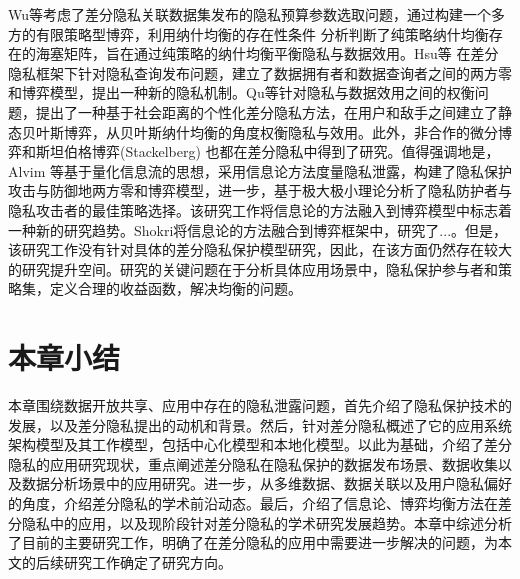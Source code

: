 Wu等\cite{Wu2017Game}考虑了差分隐私关联数据集发布的隐私预算参数选取问题，通过构建一个多方的有限策略型博弈，利用纳什均衡的存在性条件\cite{Glicksberg1952A} 分析判断了纯策略纳什均衡存在的海塞矩阵，旨在通过纯策略的纳什均衡平衡隐私与数据效用。Hsu等\cite{Hsu2012Differential} 在差分隐私框架下针对隐私查询发布问题，建立了数据拥有者和数据查询者之间的两方零和博弈模型，提出一种新的隐私机制。Qu等\cite{cui2019improving}针对隐私与数据效用之间的权衡问题，提出了一种基于社会距离的个性化差分隐私方法，在用户和敌手之间建立了静态贝叶斯博弈，从贝叶斯纳什均衡的角度权衡隐私与效用。此外，非合作的微分博弈\cite{gao2019a}和斯坦伯格博弈(Stackelberg)\cite{fioretto2020differential} 也都在差分隐私中得到了研究。值得强调地是，Alvim 等\cite{alvim2017information,alvim2018leakage}基于量化信息流的思想，采用信息论方法度量隐私泄露，构建了隐私保护攻击与防御地两方零和博弈模型，进一步，基于极大极小理论\cite{du1995minimax}分析了隐私防护者与隐私攻击者的最佳策略选择。该研究工作将信息论的方法融入到博弈模型中标志着一种新的研究趋势。Shokri\cite{shokri2015privacy}将信息论的方法融合到博弈框架中，研究了...。但是，该研究工作没有针对具体的差分隐私保护模型研究，因此，在该方面仍然存在较大的研究提升空间。研究的关键问题在于分析具体应用场景中，隐私保护参与者和策略集，定义合理的收益函数，解决均衡的问题。



\section{本章小结}

本章围绕数据开放共享、应用中存在的隐私泄露问题，首先介绍了隐私保护技术的发展，以及差分隐私提出的动机和背景。然后，针对差分隐私概述了它的应用系统架构模型及其工作模型，包括中心化模型和本地化模型。以此为基础，介绍了差分隐私的应用研究现状，重点阐述差分隐私在隐私保护的数据发布场景、数据收集以及数据分析场景中的应用研究。进一步，从多维数据、数据关联以及用户隐私偏好的角度，介绍差分隐私的学术前沿动态。最后，介绍了信息论、博弈均衡方法在差分隐私中的应用，以及现阶段针对差分隐私的学术研究发展趋势。本章中综述分析了目前的主要研究工作，明确了在差分隐私的应用中需要进一步解决的问题，为本文的后续研究工作确定了研究方向。



